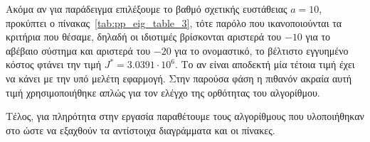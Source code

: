 Ακόμα αν για παράδειγμα επιλέξουμε το βαθμό σχετικής ευστάθειας \( a = 10 \),
προκύπτει ο πίνακας~\ref{tab:pp_eig_table_3}, τότε παρόλο που ικανοποιούνται τα
κριτήρια που θέσαμε, δηλαδή οι ιδιοτιμές βρίσκονται αριστερά του \( -10 \) για
το αβέβαιο σύστημα και αριστερά του \( -20 \) για το ονομαστικό, το βέλτιστο
εγγυημένο κόστος φτάνει την τιμή \( J^* = 3.0391 \cdot 10^6 \).  Το αν είναι
αποδεκτή μία τέτοια τιμή έχει να κάνει με την υπό μελέτη εφαρμογή.  Στην
παρούσα φάση η πιθανόν ακραία αυτή τιμή χρησιμοποιήθηκε απλώς για τον ελέγχο
της ορθότητας του αλγορίθμου.

Τέλος, για πληρότητα στην εργασία παραθέτουμε τους αλγορίθμους που υλοποιήθηκαν
στο  ώστε να εξαχθούν τα αντίστοιχα διαγράμματα και οι πίνακες.
\eng{}
